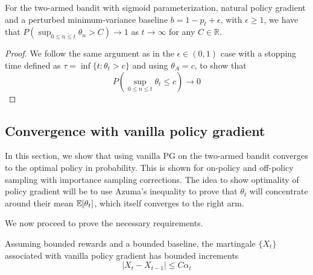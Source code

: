 \begin{lemma}
\label{lem:prop_epsilon_1inf}
For the two-armed bandit with sigmoid parameterization, natural policy gradient and a perturbed minimum-variance baseline $b = 1-p_t +\epsilon$, with $\epsilon \ge 1$, we have that $P(\sup_{0 \le n \le t} \theta_n > C) \xrightarrow{} 1$ as $t \xrightarrow{} \infty$ for any $C \in \mathbb{R}$.
\end{lemma}
\begin{proof}
We follow the same argument as in the $\epsilon \in (0,1)$ case with a stopping time defined as $\tau = \inf \{t : \theta_t > c \} $ and using $\theta_A = c$, to show that
\[ P\left( \sup_{0 \le n \le t} \theta_t \le c \right)  \xrightarrow{} 0\]
\end{proof}




\subsection{Convergence with vanilla policy gradient}
\label{app:2arm_vanilla_pg}

In this section, we show that using vanilla PG on the two-armed bandit converges to the optimal policy in probability. This is shown for on-policy and off-policy sampling with importance sampling corrections.
The idea to show optimality of policy gradient will be to use Azuma's inequality to prove that $\theta_t$ will concentrate around their mean $\mathbb{E}[\theta_t]$, which itself converges to the right arm.


We now proceed to prove the necessary requirements.

\begin{lemma} Assuming bounded rewards and a bounded baseline, the martingale $\{X_t\}$ associated with vanilla policy gradient has bounded increments
$$|X_t - X_{t-1}| \le C \alpha_t$$
\label{proposition:pg_bounded}
\end{lemma}

